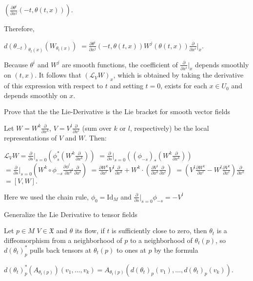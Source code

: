 \(\left( \frac{\partial \theta^i}{\partial x^j}(-t, \theta(t, x)) \right).\)

Therefore,

\(d(\theta_{-t})_{\theta_t(x)}(W_{\theta_t(x)})\)
\(= \frac{\partial \theta^i}{\partial x^j}(-t, \theta(t, x)) W^j(\theta(t, x)) \frac{\partial}{\partial x^i} \bigg|_x.\)

Because \(\theta^i\) and \(W^j\) are smooth functions, the coefficient of \(\frac{\partial}{\partial x^i}|_x\) depends smoothly on \((t, x)\). 
It follows that \((\mathcal{L}_V W)_x\), which is obtained by taking the derivative of this expression with respect to \(t\) 
and setting \(t = 0\), exists for each \(x \in U_0\) and depends smoothly on \(x\).

Prove that the the Lie-Derivative is the Lie bracket for smooth vector fields

Let \(W = W^k \frac{\partial}{\partial x^k}\), \(V = V^l \frac{\partial}{\partial x^l}\) (sum over \(k\) or \(l\), respectively) 
be the local representations of \(V\) and \(W\). Then:

\(\mathcal{L}_V W = \frac{\partial}{\partial s}\bigg|_{s=0} \left( \phi_s^* (W^k \frac{\partial}{\partial x^k} ) \right) \)
\(= \frac{\partial}{\partial s}\bigg|_{s=0} \left( (\phi_{-s})_* (W^k \frac{\partial}{\partial x^k} ) \right)\)
\(= \frac{\partial}{\partial s}\bigg|_{s=0} \left( W^k \circ \phi_{-s} \frac{\partial \phi_{-s}^l}{\partial x^k} \frac{\partial}{\partial x^l} \right)\)
\(= \frac{\partial W^k}{\partial x^l} V^l \frac{\partial}{\partial x^k} + W^k \cdot \left( \frac{\partial V^l}{\partial x^k} \frac{\partial}{\partial x^l} \right)\)
\(= \left( V^l \frac{\partial W^k}{\partial x^l} - W^l \frac{\partial V^k}{\partial x^l} \right) \frac{\partial}{\partial x^k}\)
\(= [V, W].\)

Here we used the chain rule, \(\phi_0 = \text{Id}_M\) and \(\frac{\partial}{\partial s}\bigg|_{s=0} \phi_{-s} = -V^l\)


Generalize the Lie Derivative to tensor fields

Let \( p \in M \) \( V \in \mathfrak{X}\) and \( \theta \) its flow, if \(t\) is sufficiently close to zero, 
then \(\theta_t\) is a diffeomorphism from a neighborhood of \(p\) to a neighborhood of \(\theta_t(p)\), 
so \(d(\theta_t)_p^*\) pulls back tensors at \(\theta_t(p)\) to ones at \(p\)
by the formula

\(d(\theta_t)_p^* (A_{\theta_t(p)})(v_1, \dots, v_k) = A_{\theta_t(p)} (d(\theta_t)_p(v_1), \dots, d(\theta_t)_p(v_k)).\)

